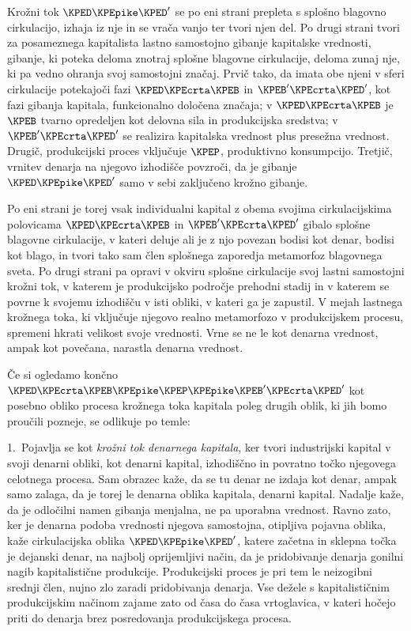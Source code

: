 \documentclass[kapital_02.tex]{subfiles}
\begin{document}
Krožni tok \(\KPED\KPEpike\KPED'\) se po eni strani prepleta s splošno blagovno cirkulacijo, izhaja iz nje in se vrača vanjo ter tvori njen del. Po drugi strani tvori za posameznega kapitalista lastno samostojno gibanje kapitalske vrednosti, gibanje, ki poteka deloma znotraj splošne blagovne cirkulacije, deloma zunaj nje, ki pa vedno ohranja svoj samostojni značaj. Prvič tako, da imata obe njeni v sferi cirkulacije potekajoči fazi \(\KPED\KPEcrta\KPEB\) in \(\KPEB'\KPEcrta\KPED'\), kot fazi gibanja kapitala, funkcionalno določena značaja; v \(\KPED\KPEcrta\KPEB\) je \(\KPEB\) tvarno opredeljen kot delovna sila in produkcijska sredstva; v \(\KPEB'\KPEcrta\KPED'\) se realizira kapitalska vrednost plus presežna vrednost. Drugič, produkcijski proces vključuje \(\KPEP\), produktivno konsumpcijo. Tretjič, vrnitev denarja na njegovo izhodišče povzroči, da je gibanje \(\KPED\KPEpike\KPED'\) samo v sebi zaključeno krožno gibanje.

Po \KPEstran eni strani je torej vsak individualni kapital z obema svojima cirkulacijskima polovicama \(\KPED\KPEcrta\KPEB\) in \(\KPEB'\KPEcrta\KPED'\) gibalo splošne blagovne cirkulacije, v kateri deluje ali je z njo povezan bodisi kot denar, bodisi kot blago, in tvori tako sam člen splošnega zaporedja metamorfoz blagovnega sveta. Po drugi strani pa opravi v okviru splošne cirkulacije svoj lastni samostojni krožni tok, v katerem je produkcijsko področje prehodni stadij in v katerem se povrne k svojemu izhodišču v isti obliki, v kateri ga je zapustil. V mejah lastnega krožnega toka, ki vključuje njegovo realno metamorfozo v produkcijskem procesu, spremeni hkrati velikost svoje vrednosti. Vrne se ne le kot denarna vrednost, ampak kot povečana, narastla denarna vrednost.

Če si ogledamo končno \(\KPED \KPEcrta \KPEB \KPEpike \KPEP \KPEpike \KPEB' \KPEcrta \KPED' \) kot posebno obliko procesa krožnega toka kapitala poleg drugih oblik, ki jih bomo proučili pozneje, se odlikuje po temle:

1.\ Pojavlja se kot \emph{krožni tok denarnega kapitala}, ker tvori industrijski kapital v svoji denarni obliki, kot denarni kapital, izhodiščno in povratno točko njegovega celotnega procesa. Sam obrazec kaže, da se tu denar ne izdaja kot denar, ampak samo zalaga, da je torej le denarna oblika kapitala, denarni kapital. Nadalje kaže, da je odločilni namen gibanja menjalna, ne pa uporabna vrednost. Ravno zato, ker je denarna podoba vrednosti njegova samostojna, otipljiva pojavna oblika, kaže cirkulacijska oblika \(\KPED\KPEpike\KPED'\), katere začetna in sklepna točka je dejanski denar, na najbolj oprijemljivi način, da je pridobivanje denarja gonilni nagib kapitalistične produkcije. Produkcijski proces je pri tem le neizogibni srednji člen, nujno zlo zaradi pridobivanja denarja. Vse dežele s kapitalističnim produkcijskim načinom zajame zato od časa do časa vrtoglavica, v kateri hočejo priti do denarja brez posredovanja produkcijskega procesa.
\end{document}
